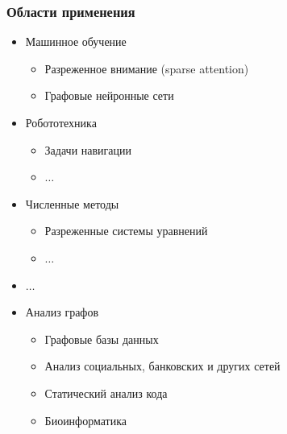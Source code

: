 \documentclass[xcolor=table,aspectratio=169]{beamer}
\begin{document}
\begin{frame}[fragile]
  \frametitle{Области применения}
  \begin{minipage}{0.46\textwidth}
    \begin{itemize}
    \item Машинное обучение
    \begin{itemize}
      \item Разреженное внимание (sparse attention)
      \item Графовые нейронные сети
    \end{itemize}
    \item Робототехника
    \begin{itemize}
      \item Задачи навигации
      \item $\ldots$
    \end{itemize}
    \item Численные методы
    \begin{itemize}
      \item Разреженные системы уравнений
      \item $\ldots$
    \end{itemize}
    \item $\ldots$
  \end{itemize}
  \end{minipage}
  \begin{minipage}[b]{0.46\textwidth}
    \begin{itemize}
      \item Анализ графов
      \begin{itemize}
        \item Графовые базы данных
        \item Анализ социальных, банковских и других сетей
        \item Статический анализ кода
        \item Биоинформатика
      \end{itemize}
    \end{itemize}
  \end{minipage}
  
\end{frame}
\end{document}
